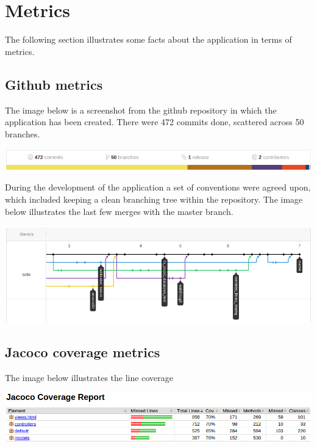 \section{Metrics}

The following section illustrates some facts about the application in terms of metrics. 

\subsection{Github metrics}

The image below is a screenshot from the github repository in which the application has been created.
There were 472 commits done, scattered across 50 branches.

\begin{center}
\includegraphics[scale=0.5]{./img/github_stats.png}
\end{center}

During the development of the application a set of conventions were agreed upon, which included keeping a clean
branching tree within the repository. The image below illustrates the last few merges with the master branch.

\begin{center}
\includegraphics[scale=0.5]{./img/github_tree.png}
\end{center}

\subsection{Jacoco coverage metrics}

The image below illustrates the line coverage

\begin{center}
\includegraphics[scale=0.5]{./img/jacoco_coverage.png}
\end{center}
